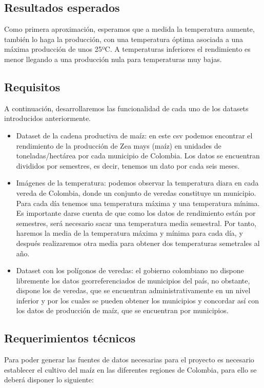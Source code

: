 \documentclass[12pt, spanish]{article}
\begin{document}
\subsection{Resultados esperados}
Como primera aproximación, esperamos que a medida la temperatura aumente, también lo haga la producción, con una temperatura óptima asociada a una máxima producción de unos 25ºC. A temperaturas inferiores el rendimiento es menor llegando a una producción nula para temperaturas muy bajas.

\newpage

\subsection{Requisitos}

A continuación, desarrollaremos las funcionalidad de cada uno de los datasets introducidos anteriormente.

\begin{itemize}
    \item Dataset de la cadena productiva de maíz: en este csv podemos encontrar el rendimiento de la producción de Zea mays (maíz) en unidades de toneladas/hectárea por cada municipio de Colombia. Los datos se encuentran divididos por semestres, es decir, tenemos un dato por cada seis meses.
    
    \item Imágenes de la temperatura: podemos observar la temperatura diara en cada vereda de Colombia, donde un conjunto de veredas constituye un municipio. Para cada día tenemos una temperatura máxima y una temperatura mínima. Es importante darse cuenta de que como los datos de rendimiento están por semestres, será necesario sacar una temperatura media semestral. Por tanto, haremos la media de la temperatura máxima y mínima para cada día, y después realizaremos otra media para obtener dos temperaturas semetrales al año.
    
    \item Dataset con los polígonos de veredas: el gobierno colombiano no dispone libremente los datos georreferenciados de municipios del país, no obstante, dispone los de veredas, que se encuentran administrativamente en un nivel inferior y por los cuales se pueden obtener los municipios y concordar así con los datos de producción de maíz, que se encuentran por municipios.
\end{itemize}


\subsection{Requerimientos técnicos}
Para poder generar las fuentes de datos necesarias para el proyecto es necesario establecer el cultivo del maíz en las diferentes regiones de Colombia, para ello se deberá disponer lo siguiente:
\end{document}

